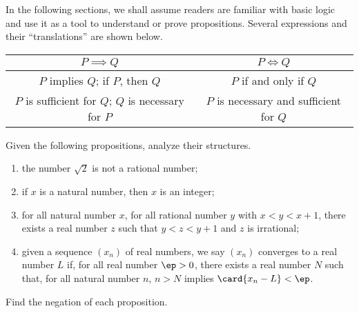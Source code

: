 \documentclass[10pt]{article}
\begin{document}
\par
In the following sections, we shall assume readers are familiar with basic logic and use it as a tool to understand or prove propositions. Several expressions and their “translations” are shown below.
\begin{center}
    \begin{tabular}{c|c}
        $P\implies Q$ & $P\iff Q$ \\
        \hline
        $P$ implies $Q$; if $P$, then $Q$ & $P$ if and only if $Q$ \\
        $P$ is sufficient for $Q$; $Q$ is necessary for $P$ & $P$ is necessary and sufficient for $Q$
    \end{tabular}
\end{center}
\begin{problem}
    Given the following propositions, analyze their structures.
    \begin{enumerate}
        \item the number $\sqrt{2}$ is not a rational number;
        \item if $x$ is a natural number, then $x$ is an integer;
        \item for all natural number $x$, for all rational number $y$ with $x<y<x+1$, there exists a real number $z$ such that $y<z<y+1$ and $z$ is irrational;
        \item given a sequence $({x}_{n})$ of real numbers, we say $({x}_{n})$ converges to a real number $L$ if, for all real number $\ep>0$, there exists a real number $N$ such that, for all natural number $n$, $n>N$ implies $\card{{x}_{n}-L}<\ep$.
    \end{enumerate} 
    Find the negation of each proposition. 
\end{problem}
\end{document}
